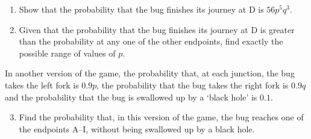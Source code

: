 \begin{problem}
\begin{center}
    \end{center}

    \begin{enumerate}
        \item Show that the probability that the bug finishes its journey at D is $56p^5 q^3$.
        \item Given that the probability that the bug finishes its journey at D is greater than the probability at any one of the other endpoints, find exactly the possible range of values of $p$.
    \end{enumerate}

    In another version of the game, the probability that, at each junction, the bug takes the left fork is $0.9p$, the probability that the bug takes the right fork is $0.9q$ and the probability that the bug is swallowed up by a `black hole' is $0.1$.

    \begin{enumerate}
        \setcounter{enumi}{2}
        \item Find the probability that, in this version of the game, the bug reaches one of the endpoints A--I, without being swallowed up by a black hole.
    \end{enumerate}
\end{problem}
